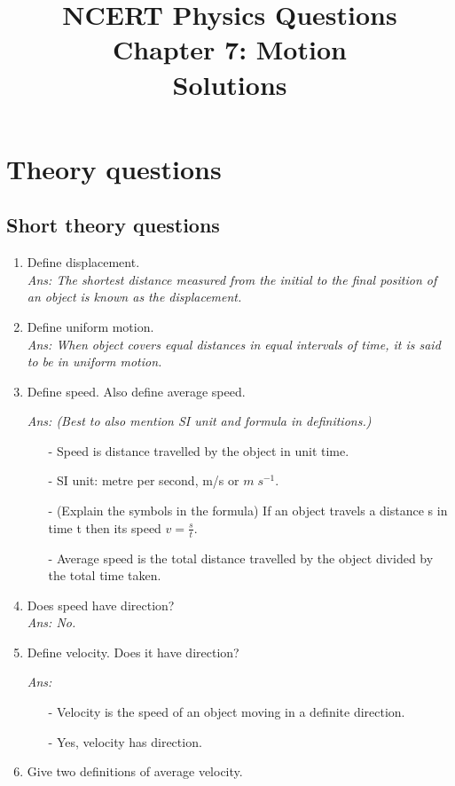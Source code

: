 \documentclass[12pt]{article}
\title{NCERT Physics Questions \\ Chapter 7: Motion \\ Solutions}
\author{}
\date{}
\begin{document}
\maketitle

\section*{Theory questions}
\subsection*{Short theory questions}
\begin{enumerate}
	\item Define displacement. \\
		\textit{Ans: The shortest distance measured from the initial to the final
			position of an object is known as the displacement.}
	\item Define uniform motion.  \\
		\textit{Ans: When object covers equal distances in equal
		intervals of time, it is said to be in uniform motion.}
	\item Define speed. Also define average speed. \\
		{\itshape Ans: (Best to also mention SI unit and formula in definitions.)
			\begin{itemize}
				\item[-] Speed is distance travelled by the object in unit time. 
				\item[-] SI unit: metre per second, m/s or $m \; s^{-1}$. 
				\item[-] (Explain the symbols in the formula) If an object travels a distance s in time t then its speed $ v = \frac{s}{t} $.
				\item[-] Average speed is the total distance travelled by the object divided by the total time taken.
			\end{itemize}
		}
	\item Does speed have direction? \\
		\textit{Ans: No. }
	\item Define velocity. Does it have direction?  \\
		{\itshape Ans:
			\begin{itemize}
				\item[-] Velocity is the speed of an object moving in a definite direction.
				\item[-] Yes, velocity has direction.
			\end{itemize}
		}
	\item Give two definitions of average velocity. \\

\end{enumerate}
\end{document}
